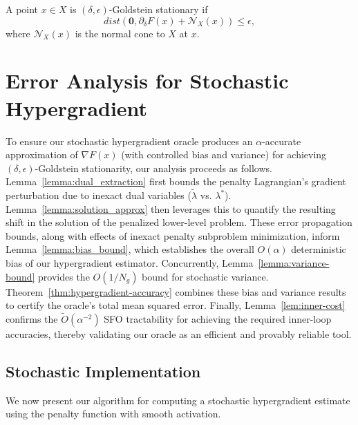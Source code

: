 \documentclass[letterpaper]{article} %
\newcommand{\1}{\mathbf{1}}
\begin{document}
\begin{definition}\label{def:goldstein_stationarity}
A point $x \in X$ is $(\delta,\epsilon)$-Goldstein stationary if
$$
dist(\mathbf{0}, \partial_\delta F(x) + \mathcal{N}_X(x)) \leq \epsilon,
$$
where $\mathcal{N}_X(x)$ is the normal cone to $X$ at $x$.
\end{definition}


\section{Error Analysis for Stochastic Hypergradient}
\label{sec:error_analysis}
To ensure our stochastic hypergradient oracle produces an $\alpha$-accurate approximation of $\nabla F(x)$ (with controlled bias and variance) for achieving $(\delta, \epsilon)$-Goldstein stationarity, our analysis proceeds as follows. Lemma~\ref{lemma:dual_extraction} first bounds the penalty Lagrangian's gradient perturbation due to inexact dual variables ($\tilde{\lambda}$ vs. $\lambda^*$). Lemma~\ref{lemma:solution_approx} then leverages this to quantify the resulting shift in the solution of the penalized lower-level problem. These error propagation bounds, along with effects of inexact penalty subproblem minimization, inform Lemma~\ref{lemma:bias_bound}, which establishes the overall $O(\alpha)$ deterministic bias of our hypergradient estimator. Concurrently, Lemma~\ref{lemma:variance-bound} provides the $O(1/N_g)$ bound for stochastic variance. Theorem~\ref{thm:hypergradient-accuracy} combines these bias and variance results to certify the oracle's total mean squared error. Finally, Lemma~\ref{lem:inner-cost} confirms the $\tilde{O}(\alpha^{-2})$ SFO tractability for achieving the required inner-loop accuracies, thereby validating our oracle as an efficient and provably reliable tool.


\subsection{Stochastic Implementation}
We now present our algorithm for computing a stochastic hypergradient estimate using the penalty function with smooth activation.
\end{document}
